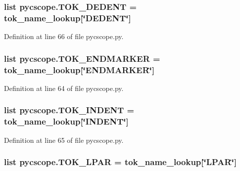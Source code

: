 \hypertarget{namespacepycscope_a3108a1650ffb20d224af52f9c2069b70}{
\subsubsection[{T\-O\-K\-\_\-\-D\-E\-D\-E\-N\-T}]{\setlength{\rightskip}{0pt plus 5cm}list pycscope.\-T\-O\-K\-\_\-\-D\-E\-D\-E\-N\-T = {\bf tok\-\_\-name\-\_\-lookup}\mbox{[}\char`\"{}D\-E\-D\-E\-N\-T\char`\"{}\mbox{]}}}\label{namespacepycscope_a3108a1650ffb20d224af52f9c2069b70}


Definition at line 66 of file pycscope.\-py.

\hypertarget{namespacepycscope_ae8bbfebf147a4717d7391d2b3db8000e}{
\subsubsection[{T\-O\-K\-\_\-\-E\-N\-D\-M\-A\-R\-K\-E\-R}]{\setlength{\rightskip}{0pt plus 5cm}list pycscope.\-T\-O\-K\-\_\-\-E\-N\-D\-M\-A\-R\-K\-E\-R = {\bf tok\-\_\-name\-\_\-lookup}\mbox{[}\char`\"{}E\-N\-D\-M\-A\-R\-K\-E\-R\char`\"{}\mbox{]}}}\label{namespacepycscope_ae8bbfebf147a4717d7391d2b3db8000e}


Definition at line 64 of file pycscope.\-py.

\hypertarget{namespacepycscope_a938e01a37014b917f30712fa3a530668}{
\subsubsection[{T\-O\-K\-\_\-\-I\-N\-D\-E\-N\-T}]{\setlength{\rightskip}{0pt plus 5cm}list pycscope.\-T\-O\-K\-\_\-\-I\-N\-D\-E\-N\-T = {\bf tok\-\_\-name\-\_\-lookup}\mbox{[}\char`\"{}I\-N\-D\-E\-N\-T\char`\"{}\mbox{]}}}\label{namespacepycscope_a938e01a37014b917f30712fa3a530668}


Definition at line 65 of file pycscope.\-py.

\hypertarget{namespacepycscope_a8eb068cdd57b2dd6ca18d3506765d0dd}{
\subsubsection[{T\-O\-K\-\_\-\-L\-P\-A\-R}]{\setlength{\rightskip}{0pt plus 5cm}list pycscope.\-T\-O\-K\-\_\-\-L\-P\-A\-R = {\bf tok\-\_\-name\-\_\-lookup}\mbox{[}\char`\"{}L\-P\-A\-R\char`\"{}\mbox{]}}}\label{namespacepycscope_a8eb068cdd57b2dd6ca18d3506765d0dd}


